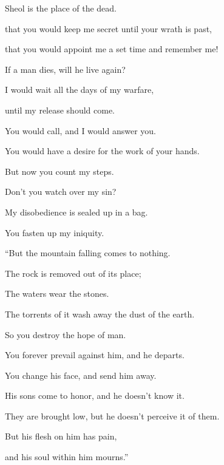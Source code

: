 {{Sheol is the place of the dead.}
\par }{\QB that you would keep me secret until your wrath is past,
\par }{\QB that you would appoint me a set time and remember me!
\par }{\Q {}If a man dies, will he live again?
\par }{\QB I would wait all the days of my warfare,
\par }{\QB until my release should come.
\par }{\Q {}You would call, and I would answer you.
\par }{\QB You would have a desire for the work of your hands.
\par }{\Q {}But now you count my steps.
\par }{\QB Don’t you watch over my sin?
\par }{\Q {}My disobedience is sealed up in a bag.
\par }{\QB You fasten up my iniquity.
\par }{\BB \par }{\Q {}“But the mountain falling comes to nothing.
\par }{\QB The rock is removed out of its place;
\par }{\Q {}The waters wear the stones.
\par }{\QB The torrents of it wash away the dust of the earth.
\par }{\QB So you destroy the hope of man.
\par }{\Q {}You forever prevail against him, and he departs.
\par }{\QB You change his face, and send him away.
\par }{\Q {}His sons come to honor, and he doesn’t know it.
\par }{\QB They are brought low, but he doesn’t perceive it of them.
\par }{\Q {}But his flesh on him has pain,
\par }{\QB and his soul within him mourns.”
\par }{\BB \par }
